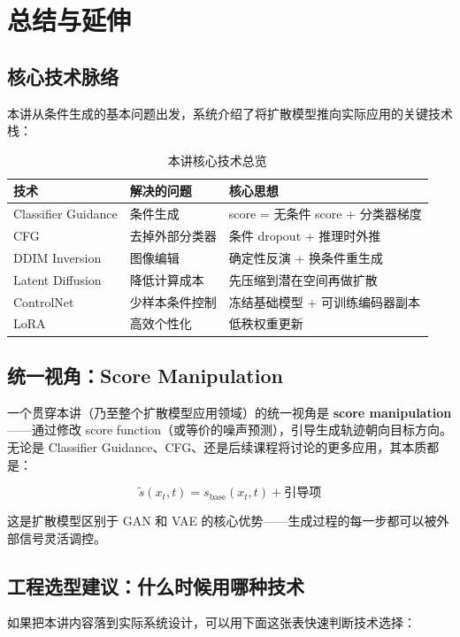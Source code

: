 \section{总结与延伸}

\subsection{核心技术脉络}

本讲从条件生成的基本问题出发，系统介绍了将扩散模型推向实际应用的关键技术栈：

\begin{table}[H]
\centering
\begin{tabular}{lp{4.5cm}p{4.5cm}}
\toprule
\textbf{技术} & \textbf{解决的问题} & \textbf{核心思想} \\
\midrule
Classifier Guidance & 条件生成 & score = 无条件 score + 分类器梯度 \\
CFG & 去掉外部分类器 & 条件 dropout + 推理时外推 \\
DDIM Inversion & 图像编辑 & 确定性反演 + 换条件重生成 \\
Latent Diffusion & 降低计算成本 & 先压缩到潜在空间再做扩散 \\
ControlNet & 少样本条件控制 & 冻结基础模型 + 可训练编码器副本 \\
LoRA & 高效个性化 & 低秩权重更新 \\
\bottomrule
\end{tabular}
\caption{本讲核心技术总览}
\end{table}

\subsection{统一视角：Score Manipulation}

一个贯穿本讲（乃至整个扩散模型应用领域）的统一视角是 \textbf{score manipulation}——通过修改 score function（或等价的噪声预测），引导生成轨迹朝向目标方向。无论是 Classifier Guidance、CFG、还是后续课程将讨论的更多应用，其本质都是：

$$
\tilde{s}(x_t, t) = s_{\text{base}}(x_t, t) + \text{引导项}
$$

这是扩散模型区别于 GAN 和 VAE 的核心优势——生成过程的每一步都可以被外部信号灵活调控。

\subsection{工程选型建议：什么时候用哪种技术}

如果把本讲内容落到实际系统设计，可以用下面这张表快速判断技术选择：

